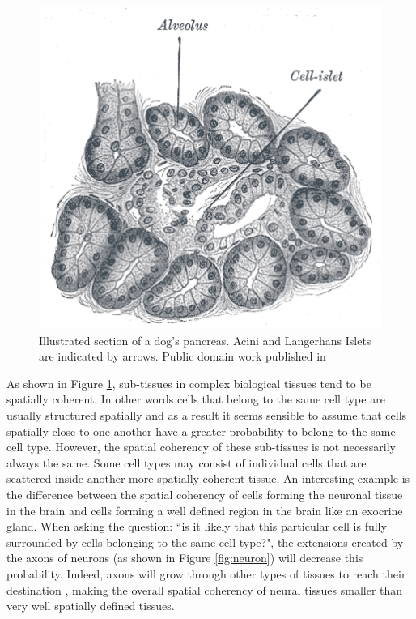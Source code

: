 \begin{figure}[bth]
\begin{center}
  \includegraphics[width=0.8\linewidth]{gfx/chapter1/pancreas.png}
\end{center}
  \caption{Illustrated section of a dog's pancreas. Acini and Langerhans Islets are indicated by arrows. Public domain work published in \cite{williams80}}
  \label{fig:pancreas}
\end{figure}
    
     
    As shown in Figure \ref{fig:pancreas}, sub-tissues in complex biological tissues tend to be spatially coherent. In other words cells that belong to the same cell type are usually structured spatially and as a result it seems sensible to assume that cells spatially close to one another have a greater probability to belong to the same cell type. However, the spatial coherency of these sub-tissues is not necessarily always the same. Some cell types may consist of individual cells that are scattered inside another more spatially coherent tissue. An interesting example is the difference between the spatial coherency of cells forming the neuronal tissue in the brain and cells forming a well defined region in the brain like an exocrine gland. When asking the question: ``is it likely that this particular cell is fully surrounded by cells belonging to the same cell type?", the extensions created by the axons of neurons (as shown in Figure \ref{fig:neuron}) will decrease this probability. Indeed, axons will grow through other types of tissues to reach their destination \cite{bartlett84,colello90}, making the overall spatial coherency of neural tissues smaller than very well spatially defined tissues.\\
    
